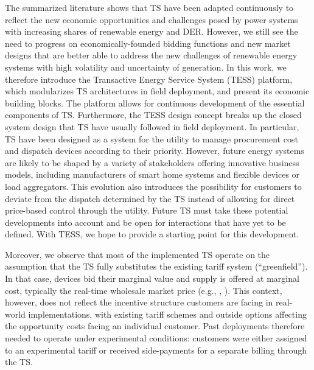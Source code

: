 The summarized literature shows that TS have been adapted continuously to reflect the new economic opportunities and challenges posed by power systems with increasing shares of renewable energy and DER.
However, we still see the need to progress on economically-founded bidding functions and new market designs that are better able to address the new challenges of renewable energy systems with high volatility and uncertainty of generation.
In this work, we therefore introduce the Transactive Energy Service System (TESS) platform, which modularizes TS architectures in field deployment, and present its economic building blocks. 
The platform allows for continuous development of the essential components of TS.
Furthermore, the TESS design concept breaks up the closed system design that TS have usually followed in field deployment. In particular, TS have been designed as a system for the utility to manage procurement cost and dispatch devices according to their priority. However, future energy systems are likely to be shaped by a variety of stakeholders offering innovative business models, including manufacturers of smart home systems and flexible devices or load aggregators. This evolution also introduces the possibility for customers to deviate from the dispatch determined by the TS instead of allowing for direct price-based control through the utility. 
Future TS must take these potential developments into account and be open for interactions that have yet to be defined. With TESS, we hope to provide a starting point for this development.

Moreover, we observe that most of the implemented TS operate on the assumption that the TS fully substitutes the existing tariff system (``greenfield''). 
In that case, devices bid their marginal value and supply is offered at marginal cost, typically the real-time wholesale market price (e.g., \citet{PNNL2006}, \citet{katipamula_transactive_2017}). This context, however, does not reflect the incentive structure customers are facing in real-world implementations, with existing tariff schemes and outside options affecting the opportunity costs facing an individual customer.  
Past deployments therefore needed to operate under experimental conditions: customers were either assigned to an experimental tariff or received side-payments for a separate billing through the TS. 

